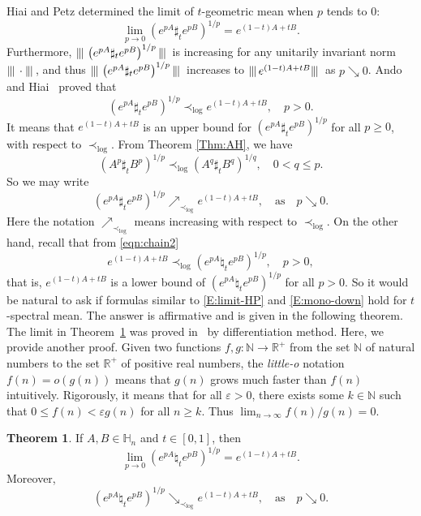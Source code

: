 \documentclass[12pt, reqno]{amsart}
\numberwithin{equation}{section}
\theoremstyle{definition}
\newtheorem{theorem}{Theorem}[section]
\renewcommand{\ge}{\geqslant}
\renewcommand{\le}{\leqslant}
\newcommand\ui{\| \!!!|}
\def\ui{\|\hspace{-.25mm} |\,}
\def\R{\mathbb R}
\def\H{\mathbb H}
\def\N{\mathbb N}
\begin{document}
Hiai and Petz \cite [Lemma 3.3] {HP93} determined the limit of $t$-geometric mean when $p$ tends to $0$:
\begin{equation}\label{E:limit-HP}
 \lim_{p \to 0} \left(e^{pA} \sharp_t e^{pB}\right)^{1/p}= e^{(1-t)A+tB}.
\end{equation}
Furthermore, $\ui \left(e^{pA} \sharp_t e^{pB}\right)^{1/p} \ui$ is increasing for any unitarily invariant norm $\ui\cdot\ui$, and thus 
$\ui \left(e^{pA} \sharp_t e^{pB}\right)^{1/p}\ui $ increases to $\ui e^{(1-t)A+tB} \ui$ as $p\searrow 0$. Ando and Hiai~\cite{AH94} proved that
\[
(e^{pA} \sharp_t e^{pB})^{1/p}\prec_{\log} e^{(1-t)A+tB},\quad p> 0.
\]
It means that $e^{(1-t)A+tB}$ is an upper bound for $(e^{pA} \sharp_t e^{pB})^{1/p}$ for all $p\ge 0$, with respect to $\prec_{\log}$. From Theorem \ref{Thm:AH}, we have 
\[
(A^p \sharp_t B^p)^{1/p}  \prec_{\log} (A^q \sharp_t B^q)^{1/q},\quad  0<q\le p.
\]
So we may write  
\begin{equation}\label{E:mono-down}
\left(e^{pA} \sharp_t e^{pB}\right)^{1/p}\nearrow_{\prec_{\log}} e^{(1-t)A+tB}, \quad \text{as}\quad p\searrow 0.
\end{equation}
Here the notation $\nearrow_{\prec_{\log}}$ means increasing with respect to $\prec_{\log}$.
On the other hand, recall that from \eqref{eqn:chain2}
\[
e^{(1-t)A+tB} \prec_{\log} (e^{pA} \natural_t e^{pB})^{1/p},\quad p> 0,
\]
that is, $e^{(1-t)A+tB}$ is a lower bound of $(e^{pA} \natural_t e^{pB})^{1/p}$ for all $p> 0$.
So it would be natural to 
ask 
if formulas similar to \eqref{E:limit-HP} and \eqref{E:mono-down} hold for $t$-spectral mean.
The answer is affirmative and is given in the following theorem. The limit in Theorem~\ref{Lem:spectral-exp} was proved in~\cite{AKL07} by differentiation method. Here, we provide another proof. 
Given two functions $f, g: \N \to \R^+$ from the set $\N$ of natural numbers to the set $\R^+$ of positive real numbers, the \emph{little-o} notation $f(n) = o(g(n))$ means that $g(n)$ grows much faster than $f(n)$ intuitively. Rigorously, it means that for all $\varepsilon>0$, there exists some $k \in \N$ such that $0\le f(n)<\varepsilon g(n)$ for all $n\ge k$. Thus $\lim_{n\to \infty}f(n)/g(n) = 0$.

\begin{theorem}\label{Lem:spectral-exp}
	If $A,B \in \H_n$  and $t\in [0, 1]$, then
\begin{equation}\label{exp-sharp}
	 \lim_{p \to 0} \left(e^{pA} \natural_t e^{pB}\right)^{1/p}=e^{(1-t)A+tB}.
\end{equation}
Moreover,
\begin{equation}\label{E:mono-up}\left(e^{pA} \natural_t e^{pB}\right)^{1/p}\searrow_{\prec_{\log}} e^{(1-t)A+tB}, \quad \text{as}\quad p\searrow 0.
\end{equation}
\end{theorem}
\end{document}
